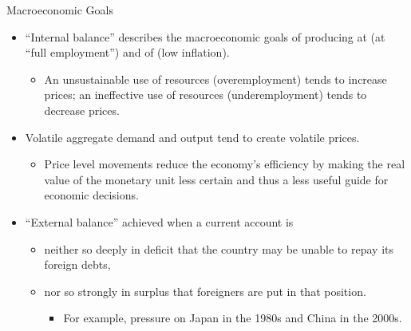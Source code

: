 \documentclass[10pt,hyperref={CJKbookmarks=true},xcolor=dvipsnames,aspectratio=169]{beamer}
\begin{document}
\begin{frame}{Macroeconomic Goals}
	\begin{itemize}
		\item “Internal balance” describes the macroeconomic goals of
		producing at  (at “full employment”) and of  (low inflation).
		\begin{itemize}
			\item An unsustainable use of resources (overemployment) tends to		increase prices; an ineffective use of resources
			(underemployment) tends to decrease prices.
		\end{itemize}
	\item Volatile aggregate demand and output tend to create volatile
	prices.
			\begin{itemize}
		\item Price level movements reduce the economy’s efficiency by
		making the real value of the monetary unit less certain and thus
		a less useful guide for economic decisions.
	\end{itemize}
	\item “External balance” achieved when a current account is
				\begin{itemize}
		\item neither so deeply in deficit that the country may be unable to
		repay its foreign debts,
		\item nor so strongly in surplus that foreigners are put in that position.
		\begin{itemize}
			\item For example, pressure on Japan in the 1980s and China in the 2000s.
		\end{itemize}
	\end{itemize}
	
	\end{itemize}
\end{frame}
\end{document}
